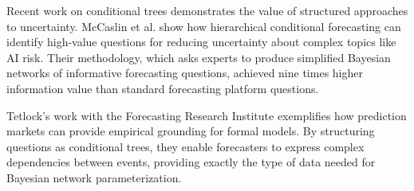 \documentclass[
  11pt,
  letterpaper,
]{book}
\begin{document}
Recent work on conditional trees demonstrates the value of structured
approaches to uncertainty. McCaslin et al. \textcite{mccaslin2024} show
how hierarchical conditional forecasting can identify high-value
questions for reducing uncertainty about complex topics like AI risk.
Their methodology, which asks experts to produce simplified Bayesian
networks of informative forecasting questions, achieved nine times
higher information value than standard forecasting platform questions.

Tetlock's work with the Forecasting Research Institute
\textcite{tetlock2022} exemplifies how prediction markets can provide
empirical grounding for formal models. By structuring questions as
conditional trees, they enable forecasters to express complex
dependencies between events, providing exactly the type of data needed
for Bayesian network parameterization.
\end{document}
